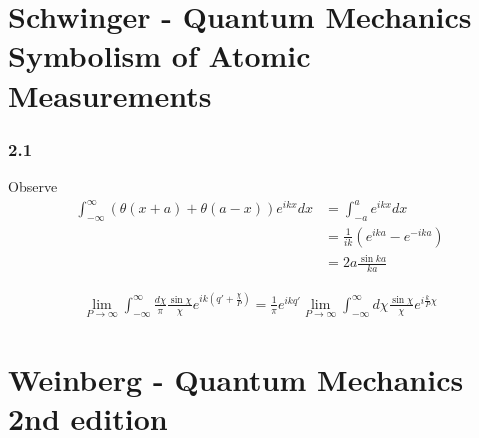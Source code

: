 \documentclass[10pt,a4paper]{book}
\theoremstyle{definition}
\begin{document}
\section{{\sc Schwinger} - Quantum Mechanics Symbolism of Atomic Measurements}
\subsubsection{2.1}
Observe
\begin{align}
    \int_{-\infty}^\infty\left(\theta(x+a)+\theta(a-x)\right)e^{ikx}dx
    &=\int_{-a}^ae^{ikx}dx\\
    &=\frac{1}{ik}\left(e^{ika}-e^{-ika}\right)\\
    &=2a \frac{\sin ka}{ka}
\end{align} 

\begin{align}
    \lim_{P\rightarrow\infty}\int_{-\infty}^\infty\frac{d\chi}{\pi}\frac{\sin\chi}{\chi}e^{ik\left(q'+\frac{\chi}{P}\right)}=\frac{1}{\pi}e^{ikq'}\lim_{P\rightarrow\infty}\int_{-\infty}^\infty d\chi\frac{\sin\chi}{\chi}e^{i\frac{k}{P}\chi}
\end{align} 



\section{{\sc Weinberg} - Quantum Mechanics 2nd edition}
\end{document}
